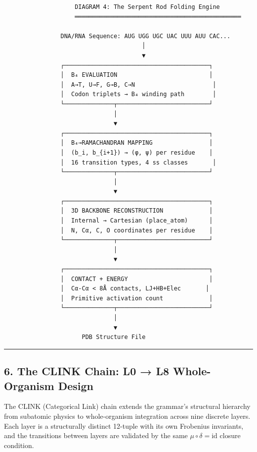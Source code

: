 \begin{verbatim}
                    DIAGRAM 4: The Serpent Rod Folding Engine
                    ═══════════════════════════════════════════════

                DNA/RNA Sequence: AUG UGG UGC UAC UUU AUU CAC...
                                       │
                                       ▼
                ┌─────────────────────────────────────────┐
                │  B₄ EVALUATION                          │
                │  A→T, U→F, G→B, C→N                      │
                │  Codon triplets → B₄ winding path        │
                └──────────────┬──────────────────────────┘
                               │
                               ▼
                ┌─────────────────────────────────────────┐
                │  B₄→RAMACHANDRAN MAPPING                │
                │  (b_i, b_{i+1}) → (φ, ψ) per residue    │
                │  16 transition types, 4 ss classes       │
                └──────────────┬──────────────────────────┘
                               │
                               ▼
                ┌─────────────────────────────────────────┐
                │  3D BACKBONE RECONSTRUCTION             │
                │  Internal → Cartesian (place_atom)      │
                │  N, Cα, C, O coordinates per residue    │
                └──────────────┬──────────────────────────┘
                               │
                               ▼
                ┌─────────────────────────────────────────┐
                │  CONTACT + ENERGY                       │
                │  Cα-Cα < 8Å contacts, LJ+HB+Elec       │
                │  Primitive activation count             │
                └──────────────┬──────────────────────────┘
                               │
                               ▼
                      PDB Structure File
\end{verbatim}

\begin{center}\rule{0.5\linewidth}{0.5pt}\end{center}

\hypertarget{the-clink-chain-l0-l8-whole-organism-design}{%
\subsection{6. The CLINK Chain: L0 → L8 Whole-Organism
Design}\label{the-clink-chain-l0-l8-whole-organism-design}}

The CLINK (Categorical Link) chain extends the grammar's structural
hierarchy from subatomic physics to whole-organism integration across
nine discrete layers. Each layer is a structurally distinct 12-tuple
with its own Frobenius invariants, and the transitions between layers
are validated by the same \(\mu \circ \delta = \text{id}\) closure
condition.

